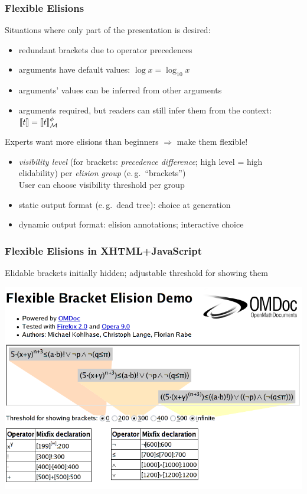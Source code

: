 \documentclass[pdftex,xcolor=svgnames]{beamer}
\newcommand{\ElisColor}[1]{\textcolor[RGB]{134,38,38}{#1}}%
\def\lden{[\kern-.15em[}\def\rden{]\kern-.15em]}
\begin{document}
\begin{frame}
  \frametitle{Flexible Elisions}
  Situations where only part of the presentation is desired:
  \begin{itemize}
  \item redundant brackets due to operator precedences
  \item arguments have default values: $\log x=\log_{10}x$
  \item arguments' values can be inferred from other arguments
  \item arguments required, but readers can still infer them from the context:
    $\lden t\rden=\lden t\rden_{\cal M}^\phi$
  \end{itemize}
  Experts want more elisions than beginners $\Rightarrow$ make them
  \ElisColor{flexible}!
  \begin{itemize}
  \item \ElisColor{\emph{visibility level}} (for brackets: \emph{precedence
      difference}; high level = high elidability) per \ElisColor{\emph{elision
        group}} (e.\,g.\ ``brackets'')\\
    User can choose visibility threshold per group
  \item static output format (e.\,g.\ dead tree): choice at generation
  \item dynamic output format: elision annotations; interactive choice
  \end{itemize}
\end{frame}

\begin{frame}
  \frametitle{Flexible Elisions in XHTML+JavaScript} Elidable brackets initially
  hidden; adjustable threshold for showing them
  \begin{center}
    \includegraphics[width=.75\textwidth]{demo-shot}
  \end{center}
\end{frame}
\end{document}
